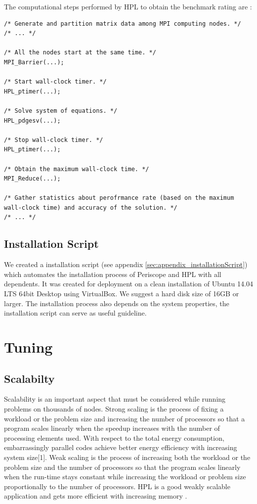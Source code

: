\documentclass[10pt,twocolumn]{article}
\begin{document}
The computational steps performed by HPL to obtain the benchmark rating are :

\begin{lstlisting}
/* Generate and partition matrix data among MPI computing nodes. */
/* ... */

/* All the nodes start at the same time. */
MPI_Barrier(...);

/* Start wall-clock timer. */
HPL_ptimer(...);

/* Solve system of equations. */
HPL_pdgesv(...);

/* Stop wall-clock timer. */
HPL_ptimer(...);

/* Obtain the maximum wall-clock time. */
MPI_Reduce(...);

/* Gather statistics about perofrmance rate (based on the maximum wall-clock time) and accuracy of the solution. */
/* ... */

\end{lstlisting}


\subsection{Installation Script}
We created a installation script (see appendix \ref{sec:appendix_installationScript}) which automates the installation process of Periscope and HPL with all dependents. It was created for deployment on a clean installation of Ubuntu 14.04 LTS 64bit Desktop using VirtualBox. We suggest a hard disk size of 16GB or larger. The installation process also depends on the system properties, the installation script can serve as useful guideline.


\section{Tuning}
\label{sec:tuning}

\subsection{Scalabilty}
Scalability is an important aspect that must be considered while running problems on thousands of nodes. Strong scaling is the process of fixing a workload or the problem size and increasing the number of processors so that a program scales linearly when the speedup increases with the number of processing elements used. With respect to the total energy consumption, embarrassingly parallel codes achieve better energy efficiency with increasing system size[1]. Weak scaling is the process of increasing both the workload or the problem size and the number of processors so that the program scales linearly when the run-time stays constant while increasing the workload or problem size proportionally to the number of processors. HPL is a good weakly scalable application and gets more efficient with increasing memory \cite{tibidabo}.
\end{document}
